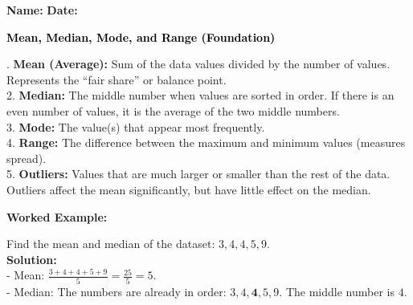 \documentclass[12pt, letterpaper, fleqn]{article}
\begin{document}
\textbf{Name:} \underline{\hspace{5cm}}
\hfill
\textbf{Date:} \underline{\hspace{3cm}}\\

\begin{tcolorbox}[colback=black!10]
    \large\textcolor{black}{\textbf{Mean, Median, Mode, and Range (Foundation)}}
\end{tcolorbox}

\vspace{3mm}

. \textbf{Mean (Average):} Sum of the data values divided by the number of values. Represents the ``fair share'' or balance point. \\
2. \textbf{Median:} The middle number when values are sorted in order. If there is an even number of values, it is the average of the two middle numbers. \\
3. \textbf{Mode:} The value(s) that appear most frequently. \\
4. \textbf{Range:} The difference between the maximum and minimum values (measures spread). \\
5. \textbf{Outliers:} Values that are much larger or smaller than the rest of the data. Outliers affect the mean significantly, but have little effect on the median.

\vspace{4mm}

\begin{tcolorbox}[colback=white, colframe=black!25, boxrule=0.6pt, arc=4mm, left=6mm, right=6mm, top=5mm, bottom=5mm]
\textbf{Worked Example:}

\medskip
\noindent
Find the mean and median of the dataset: $3, 4, 4, 5, 9$.\\
\textbf{Solution:}\\
- Mean: $\frac{3 + 4 + 4 + 5 + 9}{5} = \frac{25}{5} = 5.$\\
- Median: The numbers are already in order: $3, 4, \mathbf{4}, 5, 9$. The middle number is $4$.
\end{tcolorbox}

\vspace{4mm}
\end{document}
